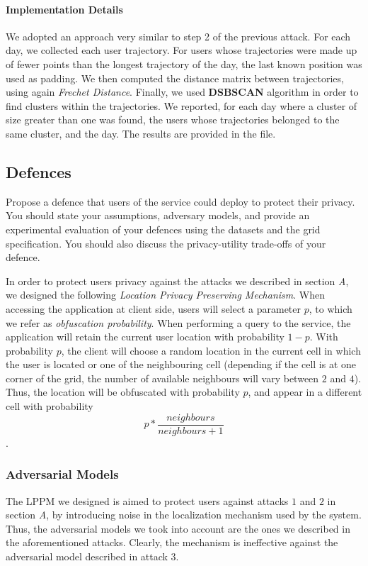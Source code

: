 \documentclass[10pt,conference,compsocconf]{IEEEtran}
\begin{document}
\paragraph{Implementation Details}
We adopted an approach very similar to step 2 of the previous attack. For each day, we collected each user trajectory. For users whose trajectories were made up of fewer points than the longest trajectory of the day, the last known position was used as padding. We then computed the distance matrix between trajectories, using again \textit{Frechet Distance}. Finally, we used \textbf{DSBSCAN} algorithm in order to find clusters within the trajectories. We reported, for each day where a cluster of size greater than one was found, the users whose trajectories belonged to the same cluster, and the day. The results are provided in the  file.


\subsection{Defences}
Propose a defence that users of the service could deploy to protect their privacy.  You
should state your assumptions, adversary models, and provide an experimental evaluation of your
defences using the datasets and the grid specification. You should also discuss the
privacy-utility trade-offs of your defence.

In order to protect users privacy against the attacks we described in section \textit{A}, we designed the following \textit{Location Privacy Preserving Mechanism}. When accessing the application at client side, users will select a parameter $p$, to which we refer as \textit{obfuscation probability}. When performing a query to the service, the application will retain the current user location with probability $1-p$. With probability $p$, the client will choose a random location in the current cell in which the user is located or one of the neighbouring cell (depending if the cell is at one corner of the grid, the number of available neighbours will vary between $2$ and $4$). Thus, the location will be obfuscated with probability $p$, and appear in a different cell with probability \[p*\frac{neighbours}{neighbours+1}\].
\subsubsection{Adversarial Models}
The LPPM we designed is aimed to protect users against attacks $1$ and $2$ in section \textit{A}, by introducing noise in the localization mechanism used by the system. Thus, the adversarial models we took into account are the ones we described in the aforementioned attacks. Clearly, the mechanism is ineffective against the adversarial model described in attack $3$.
\end{document}
